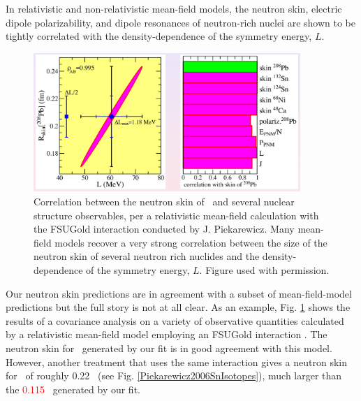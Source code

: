 In relativistic and non-relativistic mean-field models, the neutron skin,
electric dipole polarizability, and dipole resonances of neutron-rich nuclei are
shown to be tightly correlated with the density-dependence of the symmetry
energy, $L$.
\begin{figure}[tb]
    \centering
    \includegraphics[width=0.9\textwidth]{figures/PiekarewiczPb208SkinCorrelation.png}
    \caption[Correlation between the neutron skin of \pbEight\ and several nuclear structure
    observables]
    {
        Correlation between the neutron skin of \pbEight\ and several nuclear structure observables,
        per a relativistic mean-field calculation with the FSUGold interaction
        conducted by J. Piekarewicz. Many
        mean-field models recover a very strong correlation between the size of the
        neutron skin of several neutron rich nuclides and the density-dependence of the symmetry
        energy, $L$. Figure used with permission.
    }
    \label{PiekarewiczPb208SkinCorrelation}
\end{figure}
Our neutron skin predictions are in agreement with a subset of mean-field-model predictions
but the full story is not at all clear. As an example, Fig. \ref{PiekarewiczPb208SkinCorrelation}
shows the results of a covariance analysis on a variety of observative
quantities calculated by a relativistic mean-field model 
employing an FSUGold interaction \cite{Fattoyev2012}. The neutron
skin for \pbEight\ generated by our fit is in good agreement with this model.
However, another treatment that uses the same interaction
\cite{Piekarewicz2006} gives a neutron skin for \snFour\ of roughly 0.22
\femto\meter\ (see Fig. \ref{Piekarewicz2006SnIsotopes}), much larger than the
\textcolor{red}{0.115} \femto\meter\ generated by our fit.
